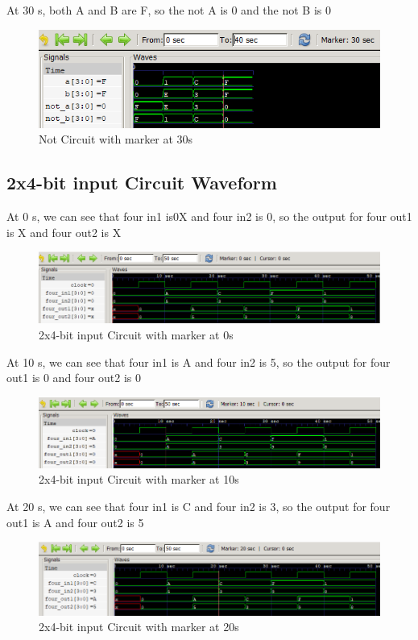 \documentclass[12pt]{article}
\begin{document}
At 30 s, both A and B are F, so the not A is 0 and the not B is 0
\begin{figure}[h]
    \centering
    \includegraphics[width = 1.0\textwidth]{figs/Not30.png}
    \caption{Not Circuit with marker at 30s}
    \label{fig:enter-label}
\end{figure}




\subsection{2x4-bit input Circuit Waveform}

At 0 s, we can see that four in1 is0X and four in2 is 0, so the output for four out1 is X and four out2 is X
\begin{figure}[h]
    \centering
    \includegraphics[width = 1.0\textwidth]{figs/Input0.png}
    \caption{2x4-bit input Circuit with marker at 0s}
    \label{fig:enter-label}
\end{figure}


At 10 s, we can see that four in1 is A and four in2 is 5, so the output for four out1 is 0 and four out2 is 0
\begin{figure}[h]
    \centering
    \includegraphics[width = 1.0\textwidth]{figs/Input10.png}
    \caption{2x4-bit input Circuit with marker at 10s}
    \label{fig:enter-label}
\end{figure}


At 20 s, we can see that four in1 is C and four in2 is 3, so the output for four out1 is A and four out2 is 5
\begin{figure}[h]
    \centering
    \includegraphics[width = 1.0\textwidth]{figs/Input20.png}
    \caption{2x4-bit input Circuit with marker at 20s}
    \label{fig:enter-label}
\end{figure}
\end{document}
